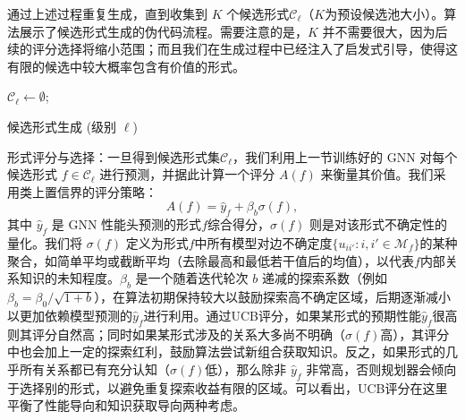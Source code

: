 \documentclass[../main.tex]{subfiles}
\begin{document}
通过上述过程重复生成，直到收集到 $K$ 个候选形式$\mathcal{C}_\ell$（$K$为预设候选池大小）。算法展示了候选形式生成的伪代码流程。需要注意的是，$K$ 并不需要很大，因为后续的评分选择将缩小范围；而且我们在生成过程中已经注入了启发式引导，使得这有限的候选中较大概率包含有价值的形式。

\begin{algorithm}[tb]
	\small
	\DontPrintSemicolon
	$\mathcal{C}_\ell \leftarrow \emptyset$;
	\caption{候选形式生成 (级别 $\ell$)}
	\label{alg:candidates}
\end{algorithm}

形式评分与选择：一旦得到候选形式集$\mathcal{C}_\ell$，我们利用上一节训练好的 GNN 对每个候选形式 $f\in\mathcal{C}_\ell$ 进行预测，并据此计算一个评分 $A(f)$ 来衡量其价值。我们采用类上置信界的评分策略：
\begin{equation}
	A(f) = \hat{y}_f + \beta_b \sigma(f),
\end{equation}
其中 $\hat{y}_f$ 是 GNN 性能头预测的形式$f$综合得分，$\sigma(f)$ 则是对该形式不确定性的量化。我们将 $\sigma(f)$ 定义为形式$f$中所有模型对边不确定度$\{u_{ii'}: i,i'\in \mathcal{M}_f\}$的某种聚合，如简单平均或截断平均（去除最高和最低若干值后的均值），以代表$f$内部关系知识的未知程度。$\beta_b$ 是一个随着迭代轮次 $b$ 递减的探索系数（例如$\beta_b = \beta_0 / \sqrt{1+b}$），在算法初期保持较大以鼓励探索高不确定区域，后期逐渐减小以更加依赖模型预测的$\hat{y}_f$进行利用。通过UCB评分，如果某形式的预期性能$\hat{y}_f$很高则其评分自然高；同时如果某形式涉及的关系大多尚不明确（$\sigma(f)$高），其评分中也会加上一定的探索红利，鼓励算法尝试新组合获取知识。反之，如果形式的几乎所有关系都已有充分认知（$\sigma(f)$低），那么除非 $\hat{y}_f$ 非常高，否则规划器会倾向于选择别的形式，以避免重复探索收益有限的区域。可以看出，UCB评分在这里平衡了性能导向和知识获取导向两种考虑。
\end{document}
